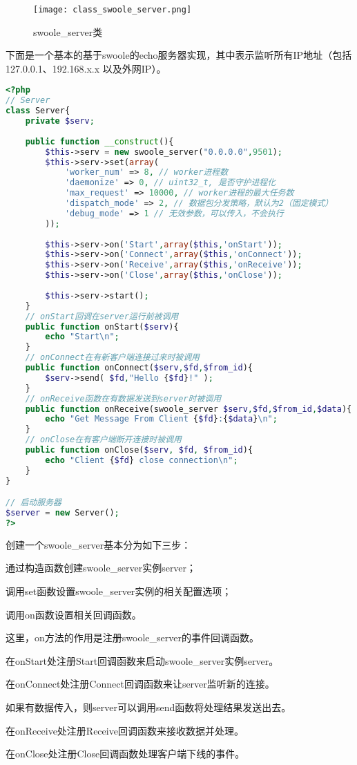 \begin{figure}[htbp]
\centering
\texttt{[image: class\_swoole\_server.png]}
\caption{swoole\_server类}
\end{figure}


下面是一个基本的基于swoole的echo服务器实现，其中表示监听所有IP地址（包括 127.0.0.1、192.168.x.x 以及外网IP）。



\begin{lstlisting}[language=PHP]
<?php
// Server
class Server{
	private $serv;
	
	public function __construct(){
		$this->serv = new swoole_server("0.0.0.0",9501);
		$this->serv->set(array(
			'worker_num' => 8, // worker进程数
			'daemonize' => 0, // uint32_t, 是否守护进程化
			'max_request' => 10000, // worker进程的最大任务数
			'dispatch_mode' => 2, // 数据包分发策略，默认为2（固定模式）
			'debug_mode' => 1 // 无效参数，可以传入，不会执行
		));
		
		$this->serv->on('Start',array($this,'onStart'));
		$this->serv->on('Connect',array($this,'onConnect'));
		$this->serv->on('Receive',array($this,'onReceive'));
		$this->serv->on('Close',array($this,'onClose'));
		
		$this->serv->start();
	}
	// onStart回调在server运行前被调用
	public function onStart($serv){ 
		echo "Start\n";
	}
	// onConnect在有新客户端连接过来时被调用
	public function onConnect($serv,$fd,$from_id){ 
		$serv->send( $fd,"Hello {$fd}!" );
	}
	// onReceive函数在有数据发送到server时被调用
	public function onReceive(swoole_server $serv,$fd,$from_id,$data){
		echo "Get Message From Client {$fd}:{$data}\n";
	}
	// onClose在有客户端断开连接时被调用
	public function onClose($serv, $fd, $from_id){
		echo "Client {$fd} close connection\n";
	}
}

// 启动服务器
$server = new Server();
?>
\end{lstlisting}

创建一个swoole\_server基本分为如下三步：

\begin{compactitem}
\item 通过构造函数创建swoole\_server实例server；
\item 调用set函数设置swoole\_server实例的相关配置选项；
\item 调用on函数设置相关回调函数。
\end{compactitem}

这里，on方法的作用是注册swoole\_server的事件回调函数。

\begin{compactitem}
\item 在onStart处注册Start回调函数来启动swoole\_server实例server。
\item 在onConnect处注册Connect回调函数来让server监听新的连接。

如果有数据传入，则server可以调用send函数将处理结果发送出去。

\item 在onReceive处注册Receive回调函数来接收数据并处理。
\item 在onClose处注册Close回调函数处理客户端下线的事件。
\end{compactitem}

